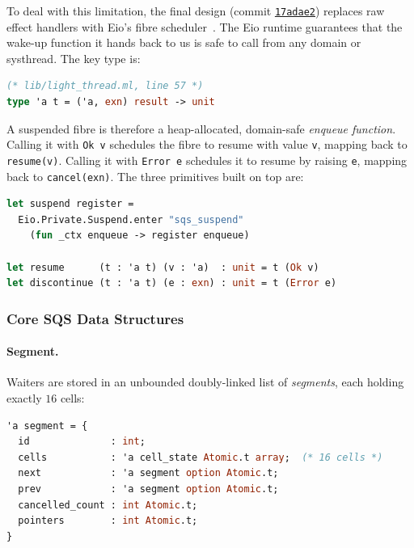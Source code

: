 \documentclass[11pt,a4paper]{article}
\newcommand{\commit}[1]{%
  \href{https://github.com/durwasa-chakraborty/CS6868_Concurrent_Programming_Project/commit/#1}%
       {\texttt{#1}}}
\begin{document}
To deal with this limitation, the final design (commit \commit{17adae2})
replaces raw effect handlers with Eio's fibre scheduler~\cite{eio}.
The Eio runtime guarantees that the wake-up function it hands back to
us is safe to call from any domain or systhread. The key type is:

\noindent\begin{minipage}{\linewidth}
\begin{lstlisting}[language=Caml]
(* lib/light_thread.ml, line 57 *)
type 'a t = ('a, exn) result -> unit
\end{lstlisting}
\end{minipage}

A suspended fibre is therefore a heap-allocated, domain-safe
\emph{enqueue function}. Calling it with \texttt{Ok~v} schedules the
fibre to resume with value \texttt{v}, mapping back to
\texttt{resume(v)}. Calling it with \texttt{Error~e} schedules it to
resume by raising \texttt{e}, mapping back to \texttt{cancel(exn)}.
The three primitives built on top are:

\noindent\begin{minipage}{\linewidth}
\begin{lstlisting}[language=Caml]
let suspend register =
  Eio.Private.Suspend.enter "sqs_suspend"
    (fun _ctx enqueue -> register enqueue)

let resume      (t : 'a t) (v : 'a)  : unit = t (Ok v)
let discontinue (t : 'a t) (e : exn) : unit = t (Error e)
\end{lstlisting}
\end{minipage}

\subsubsection{Core SQS Data Structures}
\label{sec:impl-sqs-data}

\paragraph{Segment.}
Waiters are stored in an unbounded doubly-linked list of
\emph{segments}, each holding exactly $16$ cells:

\noindent\begin{minipage}{\linewidth}
\begin{lstlisting}[language=Caml]
'a segment = {
  id              : int;
  cells           : 'a cell_state Atomic.t array;  (* 16 cells *)
  next            : 'a segment option Atomic.t;
  prev            : 'a segment option Atomic.t;
  cancelled_count : int Atomic.t;
  pointers        : int Atomic.t;
}
\end{lstlisting}
\end{minipage}
\end{document}

